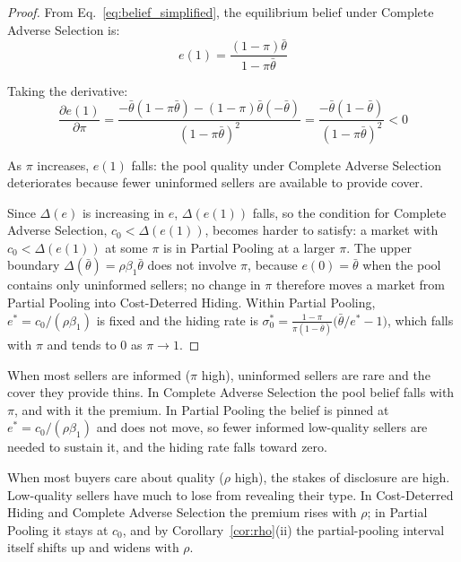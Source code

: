 \documentclass[10pt,letterpaper]{bp-template-concise}
\begin{document}
\begin{proof}
From Eq.~\eqref{eq:belief_simplified}, the equilibrium belief under Complete Adverse Selection is:
\begin{equation}
    e(1) = \frac{(1-\pi)\bar{\theta}}{1 - \pi\bar{\theta}}
\end{equation}

Taking the derivative:
\begin{equation}
    \frac{\partial e(1)}{\partial \pi} = \frac{-\bar{\theta}(1-\pi\bar{\theta}) - (1-\pi)\bar{\theta}(-\bar{\theta})}{(1-\pi\bar{\theta})^2} = \frac{-\bar{\theta}(1-\bar{\theta})}{(1-\pi\bar{\theta})^2} < 0
\end{equation}

As $\pi$ increases, $e(1)$ falls: the pool quality under Complete Adverse Selection deteriorates because fewer uninformed sellers are available to provide cover.

Since $\Delta(e)$ is increasing in $e$, $\Delta(e(1))$ falls, so the condition for Complete Adverse Selection, $c_0 < \Delta(e(1))$, becomes harder to satisfy: a market with $c_0<\Delta(e(1))$ at some $\pi$ is in Partial Pooling at a larger $\pi$. The upper boundary $\Delta(\bar\theta)=\rho\beta_1\bar\theta$ does not involve $\pi$, because $e(0)=\bar\theta$ when the pool contains only uninformed sellers; no change in $\pi$ therefore moves a market from Partial Pooling into Cost-Deterred Hiding. Within Partial Pooling, $e^*=c_0/(\rho\beta_1)$ is fixed and the hiding rate is $\sigma_0^*=\frac{1-\pi}{\pi(1-\bar\theta)}\big(\bar\theta/e^*-1\big)$, which falls with $\pi$ and tends to $0$ as $\pi\to1$.
\end{proof}

When most sellers are informed ($\pi$ high), uninformed sellers are rare and the cover they provide thins. In Complete Adverse Selection the pool belief falls with $\pi$, and with it the premium. In Partial Pooling the belief is pinned at $e^*=c_0/(\rho\beta_1)$ and does not move, so fewer informed low-quality sellers are needed to sustain it, and the hiding rate falls toward zero.

When most buyers care about quality ($\rho$ high), the stakes of disclosure are high. Low-quality sellers have much to lose from revealing their type. In Cost-Deterred Hiding and Complete Adverse Selection the premium rises with $\rho$; in Partial Pooling it stays at $c_0$, and by Corollary~\ref{cor:rho}(ii) the partial-pooling interval itself shifts up and widens with $\rho$.

\end{document}
